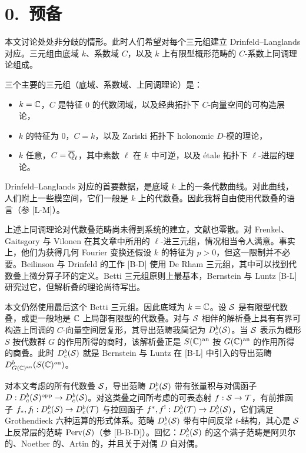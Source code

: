 \section*{0.\ 预备}

本文讨论处处非分歧的情形。此时人们希望对每个三元组建立 Drinfeld–Langlands 对应。三元组由底域 $k$、系数域 $C$，以及 $k$ 上有限型概形范畴的 $C$-系数上同调理论组成。

三个主要的三元组（底域、系数域、上同调理论）是：
\begin{itemize}
\item[(Betti)] $k=\mathbb{C}$，$C$ 是特征 $0$ 的代数闭域，以及经典拓扑下 $C$-向量空间的可构造层论，
\item[(De Rham)] $k$ 的特征为 $0$，$C=k$，以及 Zariski 拓扑下 holonomic $D$-模的理论，
\item[($\ell$-进)] $k$ 任意，$C=\overline{\mathbb{Q}}_{\ell}$，其中素数 $\ell$ 在 $k$ 中可逆，以及 étale 拓扑下 $\ell$-进层的理论。
\end{itemize}

Drinfeld–Langlands 对应的首要数据，是底域 $k$ 上的一条代数曲线。对此曲线，人们附上一些模空间，它们一般是 $k$ 上的代数叠。因此我将自由使用代数叠的语言（参 [L-M]）。

上述上同调理论对代数叠范畴尚未得到系统的建立，文献也零散。对 Frenkel、Gaitsgory 与 Vilonen 在其文章中所用的 $\ell$-进三元组，情况相当令人满意。事实上，他们为获得几何 Fourier 变换还假设 $k$ 的特征为 $p>0$，但这一限制并不必要。Beilinson 与 Drinfeld 的工作 [B-D] 使用 De Rham 三元组，其中可以找到代数叠上微分算子环的定义。Betti 三元组原则上最基本，Bernstein 与 Luntz [B-L] 研究过它，但解析叠的理论尚待写出。

本文仍然使用最后这个 Betti 三元组。因此底域为 $k=\mathbb{C}$。设 $\mathcal{S}$ 是有限型代数叠，或更一般地是 $\mathbb{C}$ 上局部有限型的代数叠。对与 $\mathcal{S}$ 相伴的解析叠上具有有界可构造上同调的 $C$-向量空间层复形，其导出范畴我简记为 $D^{b}_{c}(\mathcal{S})$。当 $\mathcal{S}$ 表示为概形 $S$ 按代数群 $G$ 的作用所得的商时，该解析叠正是 $S(\mathbb{C})^{\mathrm{an}}$ 按 $G(\mathbb{C})^{\mathrm{an}}$ 的作用所得的商叠。此时 $D^{b}_{c}(\mathcal{S})$ 就是 Bernstein 与 Luntz 在 [B-L] 中引入的导出范畴 $D^{b}_{G(\mathbb{C})^{\mathrm{an}}}(S(\mathbb{C})^{\mathrm{an}})$。

对本文考虑的所有代数叠 $\mathcal{S}$，导出范畴 $D^{b}_{c}(\mathcal{S})$ 带有张量积与对偶函子 $D:D^{b}_{c}(\mathcal{S})^{\mathrm{opp}}\to D^{b}_{c}(\mathcal{S})$。对这类叠之间所考虑的可表态射 $f:\mathcal{S}\to\mathcal{T}$，有前推函子 $f_*,f_!:D^{b}_{c}(\mathcal{S})\to D^{b}_{c}(\mathcal{T})$ 与拉回函子 $f^*,f^!:D^{b}_{c}(\mathcal{T})\to D^{b}_{c}(\mathcal{S})$，它们满足 Grothendieck 六种运算的形式体系。范畴 $D^{b}_{c}(\mathcal{S})$ 带有中间反常 $t$-结构，其心是 $\mathcal{S}$ 上反常层的范畴 $\operatorname{Perv}(\mathcal{S})$（参 [B-B-D]）。回忆：$D^{b}_{c}(\mathcal{S})$ 的这个满子范畴是阿贝尔的、Noether 的、Artin 的，并且关于对偶 $D$ 自对偶。

